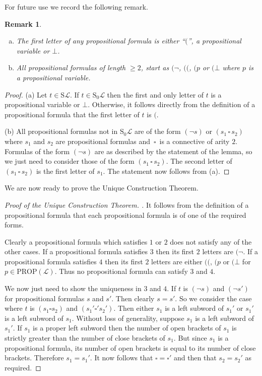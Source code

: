 \documentclass[11pt]{article}
\newcommand{\PROP}{\mathrm{PROP}}
\newcommand{\PF}{\mathrm{S}}
\newtheorem{remark}[theorem]{Remark}
\newcommand{\mcal}[1]{\mathcal{#1}}
\newcommand{\conn}{\,\square\,}
\begin{document}
For future use we record the following remark.
\begin{remark}\label{startofpropfla}
\begin{enumerate}[(a)]
\item The first letter of any propositional formula is either ``$($'', a propositional variable or $\bot$.
\item All propositional formulas of length $\geq 2$, start as $(\neg$, $(($, $(p$ or $(\bot$ where $p$ is a propositional variable.
\end{enumerate}
\end{remark}
\begin{proof}
(a) Let $t\in\PF\mcal{L}$. If $t\in \PF_0\mcal{L}$ then the first and only letter of $t$ is a propositional variable or $\bot$. Otherwise, it follows directly from the definition of a propositional formula that the first letter of $t$ is $($.

(b) All propositional formulas not in $\PF_0\mcal{L}$ are of the form $(\neg s)$ or $(s_1\conn s_2)$ where $s_1$ and $s_2$ are propositional formulas and $\conn$ is a connective of arity $2$. Formulas of the form $(\neg s)$ are as described by the statement of the lemma, so we just need to consider those of the form $(s_1\conn s_2)$. The second letter of $(s_1\conn s_2)$ is the first letter of $s_1$. The statement now follows from (a).
\end{proof}







We are now ready to prove the Unique Construction Theorem.

\begin{proof}[Proof of the Unique Construction Theorem. ]
It follows from the definition of a propositional formula that each propositional formula is of one of the required forms.

Clearly a propositional formula which satisfies $1$ or $2$ does not satisfy any of the other cases. If a propositional formula satisfies $3$ then its first $2$ letters are $(\neg$. If a propositional formula satisfies $4$ then its first $2$ letters are either $(($, $(p$ or $(\bot$ for $p\in\PROP(\mcal{L})$. Thus no propositional formula can satisfy $3$ and $4$.

We now just need to show the uniqueness in $3$ and $4$. If $t$ is $(\neg s)$ and $(\neg s')$ for propositional formulas $s$ and $s'$. Then clearly $s=s'$. So we consider the case where $t$ is $(s_1\square s_2)$ and $(s_1'\square's_2')$. Then either $s_1$ is a left subword of $s_1'$ or $s_1'$ is a left subword of $s_1$. Without loss of generality, suppose $s_1$ is a left subword of $s_1'$. If $s_1$ is a proper left subword then the number of open brackets of $s_1$ is strictly greater than the number of close brackets of $s_1$. But since $s_1$ is a propositional formula, its number of open brackets is equal to its number of close brackets. Therefore $s_1=s_1'$. It now follows that $\square =\square'$ and then that $s_2=s_2'$ as required.
\end{proof}
\end{document}
